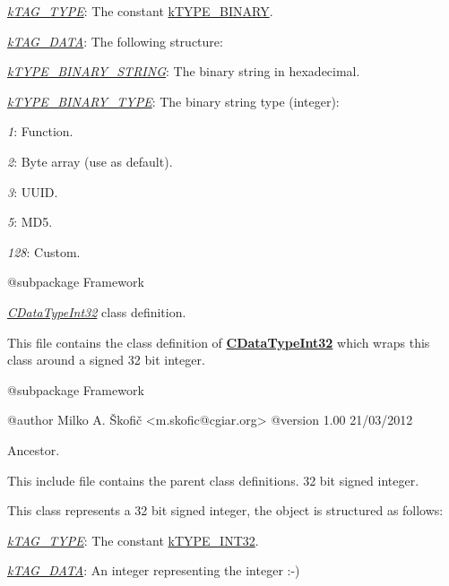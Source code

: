 \begin{DoxyItemize}
\item {\itshape \hyperlink{}{k\-T\-A\-G\-\_\-\-T\-Y\-P\-E}}\-: The constant \hyperlink{}{k\-T\-Y\-P\-E\-\_\-\-B\-I\-N\-A\-R\-Y}. 
\item {\itshape \hyperlink{}{k\-T\-A\-G\-\_\-\-D\-A\-T\-A}}\-: The following structure\-: 
\begin{DoxyItemize}
\item {\itshape \hyperlink{}{k\-T\-Y\-P\-E\-\_\-\-B\-I\-N\-A\-R\-Y\-\_\-\-S\-T\-R\-I\-N\-G}}\-: The binary string in hexadecimal. 
\item {\itshape \hyperlink{}{k\-T\-Y\-P\-E\-\_\-\-B\-I\-N\-A\-R\-Y\-\_\-\-T\-Y\-P\-E}}\-: The binary string type (integer)\-: 
\begin{DoxyItemize}
\item {\itshape 1}\-: Function. 
\item {\itshape 2}\-: Byte array (use as default). 
\item {\itshape 3}\-: U\-U\-I\-D. 
\item {\itshape 5}\-: M\-D5. 
\item {\itshape 128}\-: Custom. 
\end{DoxyItemize}
\end{DoxyItemize}
\end{DoxyItemize}

\begin{DoxyVerb}    @subpackage     Framework\end{DoxyVerb}


{\itshape \hyperlink{class_c_data_type_int32}{C\-Data\-Type\-Int32}} class definition.

This file contains the class definition of {\bfseries \hyperlink{class_c_data_type_int32}{C\-Data\-Type\-Int32}} which wraps this class around a signed 32 bit integer.

\begin{DoxyVerb}    @subpackage     Framework

    @author         Milko A. Škofič <m.skofic@cgiar.org>
    @version        1.00 21/03/2012\end{DoxyVerb}


Ancestor.

This include file contains the parent class definitions. 32 bit signed integer.

This class represents a 32 bit signed integer, the object is structured as follows\-:


\begin{DoxyItemize}
\item {\itshape \hyperlink{}{k\-T\-A\-G\-\_\-\-T\-Y\-P\-E}}\-: The constant \hyperlink{}{k\-T\-Y\-P\-E\-\_\-\-I\-N\-T32}. 
\item {\itshape \hyperlink{}{k\-T\-A\-G\-\_\-\-D\-A\-T\-A}}\-: An integer representing the integer \-:-\/) 
\end{DoxyItemize}

